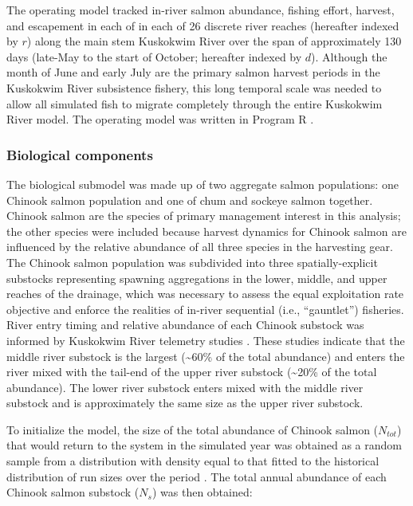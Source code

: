 \documentclass[12pt,]{book}
\theoremstyle{definition}
\theoremstyle{definition}
\theoremstyle{definition}
\theoremstyle{remark}
\begin{document}
The operating model tracked in-river salmon abundance, fishing effort,
harvest, and escapement in each of in each of 26 discrete river reaches
(hereafter indexed by \(r\)) along the main stem Kuskokwim River over
the span of approximately 130 days (late-May to the start of October;
hereafter indexed by \(d\)). Although the month of June and early July
are the primary salmon harvest periods in the Kuskokwim River
subsistence fishery, this long temporal scale was needed to allow all
simulated fish to migrate completely through the entire Kuskokwim River
model. The operating model was written in Program R \citep{r-cite}.

\subsubsection{Biological components}\label{om-biology}

\noindent
The biological submodel was made up of two aggregate salmon populations:
one Chinook salmon population and one of chum and sockeye salmon
together. Chinook salmon are the species of primary management interest
in this analysis; the other species were included because harvest
dynamics for Chinook salmon are influenced by the relative abundance of
all three species in the harvesting gear. The Chinook salmon population
was subdivided into three spatially-explicit substocks representing
spawning aggregations in the lower, middle, and upper reaches of the
drainage, which was necessary to assess the equal exploitation rate
objective and enforce the realities of in-river sequential (i.e.,
``gauntlet'') fisheries. River entry timing and relative abundance of
each Chinook substock was informed by Kuskokwim River telemetry studies
\citep{stuby-2007, smith-liller-2017a, smith-liller-2017b}. These
studies indicate that the middle river substock is the largest
(\textasciitilde{}60\% of the total abundance) and enters the river
mixed with the tail-end of the upper river substock
(\textasciitilde{}20\% of the total abundance). The lower river substock
enters mixed with the middle river substock and is approximately the
same size as the upper river substock.

To initialize the model, the size of the total abundance of Chinook
salmon (\(N_{tot}\)) that would return to the system in the simulated
year was obtained as a random sample from a distribution with density
equal to that fitted to the historical distribution of run sizes over
the period \citep[1976 -- 2017; as presented in][ and further described
in Appendix \ref{mse-data-N}]{liller-etal-2018}. The total annual
abundance of each Chinook salmon substock (\(N_s\)) was then obtained:
\end{document}

